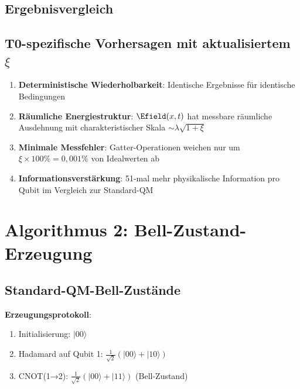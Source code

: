 	\subsection{Ergebnisvergleich}
	
	\begin{table}[htbp]
		\centering
		\caption{Deutsch-Algorithmus: Perfekte Ergebnisübereinstimmung mit aktualisiertem $\xi$}
	\end{table}
	
	\subsection{T0-spezifische Vorhersagen mit aktualisiertem $\xi$}
	
	\begin{enumerate}
		\item \textbf{Deterministische Wiederholbarkeit}: Identische Ergebnisse für identische Bedingungen
		\item \textbf{Räumliche Energiestruktur}: $\Efield(x,t)$ hat messbare räumliche Ausdehnung mit charakteristischer Skala $\sim \lambda \sqrt{1+\xi}$
		\item \textbf{Minimale Messfehler}: Gatter-Operationen weichen nur um $\xi \times 100\% = 0,001\%$ von Idealwerten ab
		\item \textbf{Informationsverstärkung}: 51-mal mehr physikalische Information pro Qubit im Vergleich zur Standard-QM
	\end{enumerate}
	
	\section{Algorithmus 2: Bell-Zustand-Erzeugung}
	
	\subsection{Standard-QM-Bell-Zustände}
	
	\textbf{Erzeugungsprotokoll}:
	\begin{enumerate}
		\item Initialisierung: $|00\rangle$
		\item Hadamard auf Qubit 1: $\frac{1}{\sqrt{2}}(|00\rangle + |10\rangle)$
		\item CNOT(1→2): $\frac{1}{\sqrt{2}}(|00\rangle + |11\rangle)$ (Bell-Zustand)
	\end{enumerate}
	
